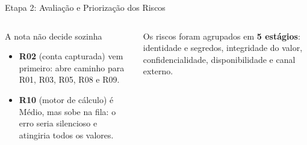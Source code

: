 \documentclass{beamer}
\begin{document}
\begin{frame}{Etapa 2: Avaliação e Priorização dos Riscos}
\begin{columns}[c]
        \vspace{0.15cm}
        \begin{block}{A nota não decide sozinha}
            \scriptsize
            \begin{itemize}
                \item \textbf{R02} (conta capturada) vem primeiro: abre caminho para R01, R03, R05, R08 e R09.
                \item \textbf{R10} (motor de cálculo) é Médio, mas sobe na fila: o erro seria silencioso e atingiria todos os valores.
            \end{itemize}
        \end{block}
        \scriptsize
        Os riscos foram agrupados em \textbf{5 estágios}: identidade e segredos, integridade do valor, confidencialidade, disponibilidade e canal externo.
    \end{columns}
\end{frame}
\end{document}
